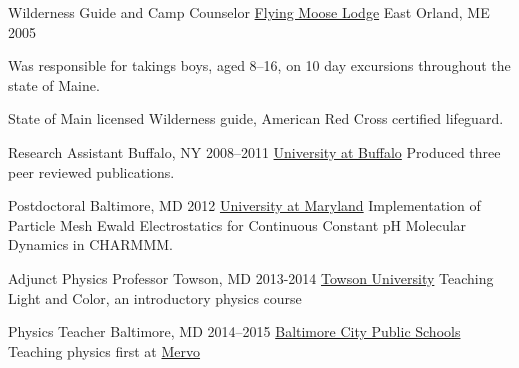


\begin{cventries}
  \cventry
    {Wilderness Guide and Camp Counselor} %
    {\href{www.flyingmooselodge.com}{Flying Moose Lodge}} %
    {East Orland, ME} %
    {2005} %
    {
    \begin{cvitems}
      \item {Was responsible for takings boys, aged 8--16, on 10 day excursions throughout the state of Maine.}
      \item {State of Main licensed Wilderness guide, American Red Cross certified lifeguard.}
    \end{cvitems}
    }

  \cventry
    {Research Assistant} %
    {Buffalo, NY} %
    {2008--2011}   %
    {\href{www.buffalo.edu}{University at Buffalo}} %
	{Produced three peer reviewed publications.}


\cventry
    {Postdoctoral} %
    {Baltimore, MD} %
    {2012}          %
    {\href{www.umaryland.edu}{University at Maryland}} %
    {Implementation of Particle Mesh Ewald Electrostatics for Continuous Constant pH Molecular Dynamics in CHARMMM.} %

\cventry
    {Adjunct Physics Professor} %
    {Towson, MD} %
    {2013-2014}  %
    {\href{www.towson.edu}{Towson University}} %
    {Teaching Light and Color, an introductory physics course} %

\cventry
    {Physics Teacher} %
    {Baltimore, MD} %
    {2014--2015}    %
    {\href{baltimorecityschools.org}{Baltimore City Public Schools}} %
    {Teaching physics first at \href{http://mervo.org}{Mervo}} %


\end{cventries}
